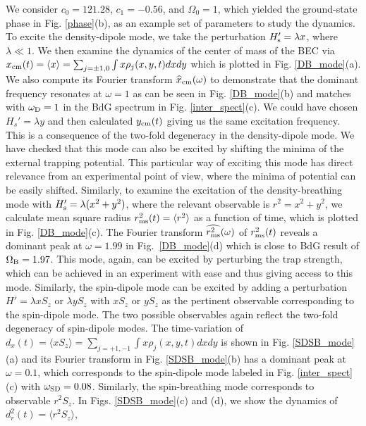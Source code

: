 \documentclass[pra,twocolumn,aps,superscriptaddress,showpacs,longbibliography]{revtex4-1}
\begin{document}
We consider $c_0 = 121.28$, $c_1 = -0.56$, and $\Omega_0 = 1$, 
which yielded the ground-state phase in Fig. \ref{phase}(b), as an example set of parameters to study the dynamics.
To excite the density-dipole mode, we take the perturbation $H_{\rm s}' = \lambda x$, where $\lambda\ll 1$. 
We then examine the dynamics of the center of mass of the BEC via $x_{\rm cm}(t) = \langle x \rangle = 
\sum_{j=\pm 1,0}\int x \rho_j(x,y,t) dxdy$ which is plotted in Fig. \ref{DB_mode}(a). 
We also compute its Fourier transform $\widehat{x}_{\rm cm}(\omega)$  to demonstrate that the dominant 
frequency resonates at $\omega=1$ as can be seen in Fig. \ref{DB_mode}(b) and matches
with $\omega_{\rm D} = 1$ in the BdG spectrum in Fig. \ref{inter_spect}(c). We could have
chosen $H_s' = \lambda y$ and then calculated $y_{\rm cm}(t)$ giving us the same excitation frequency.
This is a consequence of the two-fold degeneracy in the density-dipole mode.
We have checked that this mode can also be excited by shifting the minima of the external trapping potential.
This particular way of exciting this mode has direct relevance from an experimental point of view, where
the minima of potential can be easily shifted.
Similarly, to examine the excitation of the density-breathing mode with $H_{\rm s}' = \lambda (x^2+y^2)$, where 
the relevant observable is $r^2 = x^2+y^2$, we calculate mean square radius $r_{\rm ms}^2(t) = \langle r^2\rangle$ 
as a function of time, which is plotted in Fig. \ref{DB_mode}(c). 
The Fourier transform $\widehat{r_{\rm ms}^2}(\omega)$ of $r_{\rm ms}^2(t)$ reveals a dominant peak at 
$\omega=1.99$ in Fig.~\ref{DB_mode}(d) which is close to BdG result of $\Omega_{\rm B} = 1.97$. This mode, again, can be excited by perturbing the trap strength, which can be achieved in an 
experiment with ease and thus giving access to this mode. 
Similarly, the spin-dipole mode can be excited by adding a perturbation $H' = \lambda x S_z$ or $\lambda y S_z$  
with $x S_{z}$ or $y S_{z}$ as the pertinent observable  corresponding to the spin-dipole mode. The
two possible observables again reflect the two-fold degeneracy of spin-dipole modes.  
The time-variation of $d_x(t)= \langle x S_z\rangle = 
\sum_{j= +1,-1} \int x \rho_j(x,y,t) dx dy$
is shown in Fig. \ref{SDSB_mode}(a) and its Fourier transform in Fig. \ref{SDSB_mode}(b) 
has a dominant  peak 
at $\omega=0.1$, which corresponds to the spin-dipole mode labeled in 
Fig. \ref{inter_spect}(c) with $\omega_{\rm SD} = 0.08$. 
Similarly, the spin-breathing mode corresponds to observable $r^2 S_{z}$. 
In Figs. \ref{SDSB_mode}(c) and (d), we show the dynamics of $d_r^2(t) = \langle r^2S_z\rangle$,
\end{document}
